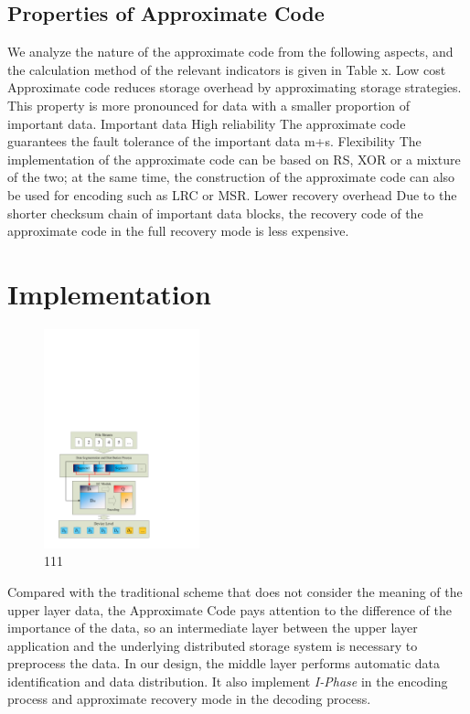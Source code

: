 \documentclass[sigconf]{acmart}
\begin{document}
\subsection{Properties of Approximate Code}

We analyze the nature of the approximate code from the following aspects, and the calculation method of the relevant indicators is given in Table x.
Low cost Approximate code reduces storage overhead by approximating storage strategies. This property is more pronounced for data with a smaller proportion of important data.
Important data High reliability The approximate code guarantees the fault tolerance of the important data m+s.
Flexibility The implementation of the approximate code can be based on RS, XOR or a mixture of the two; at the same time, the construction of the approximate code can also be used for encoding such as LRC or MSR.
Lower recovery overhead Due to the shorter checksum chain of important data blocks, the recovery code of the approximate code in the full recovery mode is less expensive.


\section{Implementation}

\begin{figure}[htb]
\centering
\includegraphics[width=0.4\textwidth]{photo/implementation.pdf}
\caption{111}
\label{fig-implementation}
\end{figure}

Compared with the traditional scheme that does not consider the meaning of the upper layer data, the Approximate Code pays attention to the difference of the importance of the data, so an intermediate layer between the upper layer application and the underlying distributed storage system is necessary to preprocess the data. In our design, the middle layer performs automatic data identification and data distribution. It also implement \emph{I-Phase} in the encoding process and approximate recovery mode in the decoding process.
\end{document}
